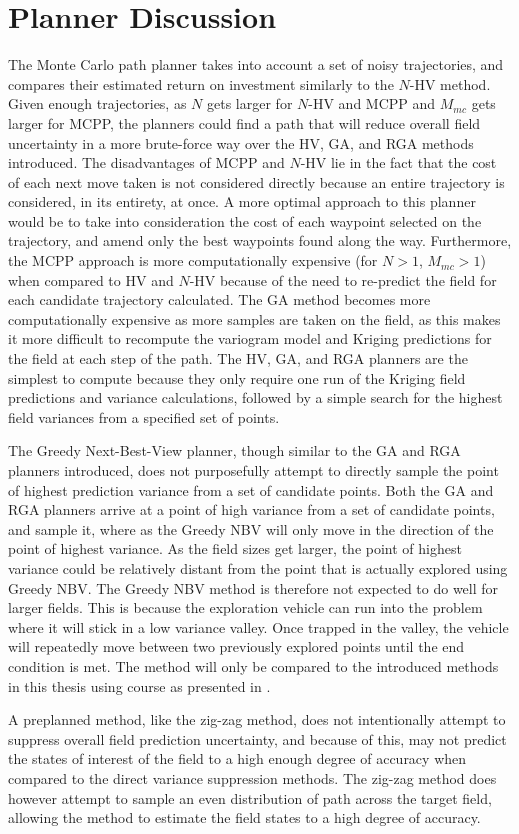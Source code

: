 \section{Planner Discussion} \label{sec:discuss}
The Monte Carlo path planner takes into account a set of noisy trajectories, and compares their estimated return on investment similarly to the $N$-HV method. Given enough trajectories, as $N$ gets larger for $N$-HV and MCPP and $M_{mc}$ gets larger for MCPP, the planners could find a path that will reduce overall field uncertainty in a more brute-force way over the HV, GA, and RGA methods introduced. The disadvantages of MCPP and $N$-HV lie in the fact that the cost of each next move taken is not considered directly because an entire trajectory is considered, in its entirety, at once. A more optimal approach to this planner would be to take into consideration the cost of each waypoint selected on the trajectory, and amend only the best waypoints found along the way. Furthermore, the MCPP approach is more computationally expensive (for $N > 1$, $M_{mc} > 1$) when compared to HV and $N$-HV because of the need to re-predict the field for each candidate trajectory calculated. The GA method becomes more computationally expensive as more samples are taken on the field, as this makes it more difficult to recompute the variogram model and Kriging predictions for the field at each step of the path. The HV, GA, and RGA planners are the simplest to compute because they only require one run of the Kriging field predictions and variance calculations, followed by a simple search for the highest field variances from a specified set of points.

The Greedy Next-Best-View planner, though similar to the GA and RGA planners introduced, does not purposefully attempt to directly sample the point of highest prediction variance from a set of candidate points. Both the GA and RGA planners arrive at a point of high variance from a set of candidate points, and sample it, where as the Greedy NBV will only move in the direction of the point of highest variance. As the field sizes get larger, the point of highest variance could be relatively distant from the point that is actually explored using Greedy NBV. The Greedy NBV method is therefore not expected to do well for larger fields. This is because the exploration vehicle can run into the problem where it will stick in a low variance valley. Once trapped in the valley, the vehicle will repeatedly move between two previously explored points until the end condition is met. The method will only be compared to the introduced methods in this thesis using course as presented in \cite{fentanes:soilkrig}.

A preplanned method, like the zig-zag method, does not intentionally attempt to suppress overall field prediction uncertainty, and because of this, may not predict the states of interest of the field to a high enough degree of accuracy when compared to the direct variance suppression methods. The zig-zag method does however attempt to sample an even distribution of path across the target field, allowing the method to estimate the field states to a high degree of accuracy.